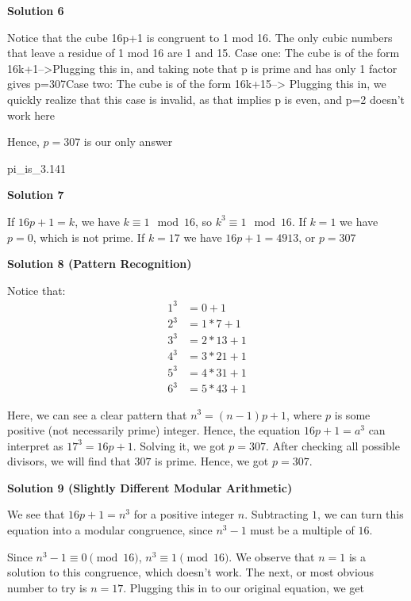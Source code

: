 \begin{enumerate}
 



\textbf{Solution 6}

Notice that the cube 16p+1 is congruent to 1 mod 16. The only cubic numbers that leave a residue of 1 mod 16 are 1 and 15. Case one: The cube is of the form 16k+1-->Plugging this in, and taking note that p is prime and has only 1 factor gives p=307Case two: The cube is of the form 16k+15--> Plugging this in, we quickly realize that this case is invalid, as that implies p is even, and p=2 doesn't work here

 Hence, $p=\boxed{307}$ is our only answer

 pi\_is\_3.141

 



\textbf{Solution 7}

If $16p+1 =k$, we have $k \equiv 1 \mod 16$, so $k^3 \equiv 1 \mod 16$. If $k=1$ we have $p=0$, which is not prime. If $k=17$ we have $16p+1=4913$, or $p=\boxed{307}$




\textbf{Solution 8 (Pattern Recognition)}

Notice that:
 \begin{align*}  1^3 &= 0 +1\\ 2^3 &= 1*7+1 \\ 3^3 &= 2*13+1\\ 4^3 &= 3*21+1\\ 5^3 &= 4*31+1\\ 6^3 &= 5*43+1 \end{align*}


 Here, we can see a clear pattern that $n^3=(n-1)p+1$, where $p$ is some positive (not necessarily prime) integer. Hence, the equation $16p+1=a^3$ can interpret as $17^3 = 16p+1$. Solving it, we got $p=307$. After checking all possible divisors, we will find that $307$ is prime. Hence, we got $p=\boxed{307}$.

 



\textbf{Solution 9 (Slightly Different Modular Arithmetic)}

We see that $16p+1=n^3$ for a positive integer $n$. Subtracting $1$, we can turn this equation into a modular congruence, since $n^3-1$ must be a multiple of $16$. 

 Since $n^3-1\equiv0\pmod{16}$, $n^3\equiv1\pmod{16}$. We observe that $n=1$ is a solution to this congruence, which doesn't work. The next, or most obvious number to try is $n=17$. Plugging this in to our original equation, we get 


\end{enumerate}
